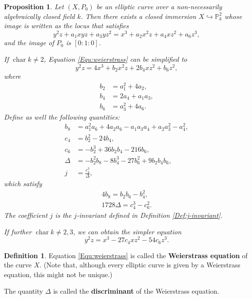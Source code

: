 \documentclass{report}
\DeclareMathOperator{\chara}{char}
\newtheorem{proposition}[equation]{Proposition}
\theoremstyle{definition}
\newtheorem{definition}[equation]{Definition}
\begin{document}
\begin{proposition}
\label{pro:weierstrass-equation}
Let $(X,P_0)$ be an elliptic curve over a non-necessarily algebraically closed field $k$. Then there exists a closed immersion $X\hookrightarrow\mathbb{P}_k^2$ whose image is written as the locus that satisfies
\begin{equation}
\label{Equ:weierstrass}
y^2z+a_1xyz+a_3yz^2=x^3+a_2x^2z+a_4xz^2+a_6z^3,
\end{equation}
and the image of $P_0$ is $[0:1:0]$.

If $\chara k\neq2$, Equation \eqref{Equ:weierstrass} can be simplified to
\[y^2z=4x^3+b_2x^2z+2b_4xz^2+b_6z^2,\]
where
\begin{align*}
b_2&=a_1^2+4a_2,\\
b_4&=2a_4+a_1a_3,\\
b_6&=a_3^2+4a_6.
\end{align*}
Define as well the following quantities:
\begin{align*}
b_8&=a_1^2a_6+4a_2a_6-a_1a_3a_4+a_2a_3^2-a_4^2,\\
c_4&=b_2^2-24b_4,\\
c_6&=-b_2^3+36b_2b_4-216b_6,\\
\Delta&=-b_2^2b_8-8b_4^3-27b_6^2+9b_2b_4b_6,\\
j&=\frac{c_4^3}{\Delta},
\end{align*}
which satisfy
\begin{align*}
4b_8=b_2b_6-b_4^2,\\
1728\Delta=c_4^3-c_6^2.
\end{align*}
The coefficient $j$ is the $j$-invariant defined in Definition \ref{Def:j-invariant}.

If further $\chara k\neq2,3$, we can obtain the simpler equation
\begin{equation}
\label{Equ:Weierstrass-simple}
y^2z=x^3-27c_4xz^2-54c_6z^3.
\end{equation}
\end{proposition}

\begin{definition}
Equation \eqref{Equ:weierstrass} is called the \textbf{Weierstrass equation} of the curve $X$. (Note that, although every elliptic curve is given by a Weierstrass equation, this might not be unique.)

The quantity $\Delta$ is called the \textbf{discriminant} of the Weierstrass equation.
\end{definition}
\end{document}
